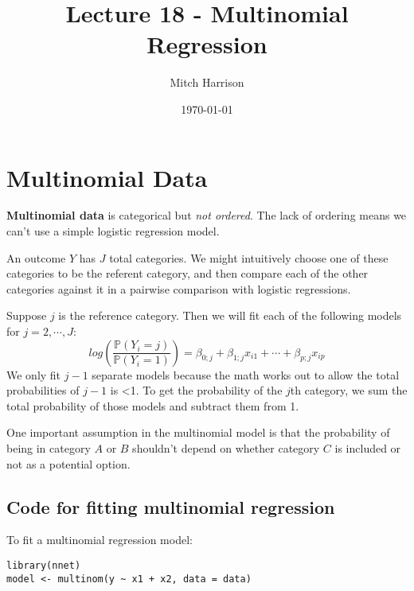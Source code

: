 \documentclass[titlepage, 12pt, leqno]{article}
\title{\Huge{Lecture 18 - Multinomial Regression}}
\author{\large{Mitch Harrison}}
\date{\today}
\begin{document}
\setlength{\parskip}{1\baselineskip}
\setlength{\parindent}{15pt}
\maketitle
\tableofcontents
\newpage


\section{Multinomial Data}

\begin{definition}
    \textbf{Multinomial data} is categorical but \textit{not ordered}. The
    lack of ordering means we can't use a simple logistic regression model.
\end{definition}

An outcome $Y$ has $J$ total categories. We might intuitively choose one of 
these categories to be the referent category, and then compare each of the
other categories against it in a pairwise comparison with logistic regressions.

Suppose $j$ is the reference category. Then we will fit each of the following
models for $j = 2, \cdots , J$:
\[
log\left(\frac{\mathbb{P}(Y_i = j)}{\mathbb{P}(Y_i = 1)}\right) =
\beta_{0;j} + \beta_{1;j}x_{i1} + \cdots + \beta_{p;j}x_{ip}
\]
We only fit $j-1$ separate models because the math works out to allow the total
probabilities of $j-1$ is <1. To get the probability of the $j$th category, we 
sum the total probability of those models and subtract them from 1.

\begin{note}
    One important assumption in the multinomial model is that the probability
    of being in category $A$ or $B$ shouldn't depend on whether category $C$ is
    included or not as a potential option.
\end{note}

\subsection{Code for fitting multinomial regression}
To fit a multinomial regression model:
\begin{verbatim}
library(nnet)
model <- multinom(y ~ x1 + x2, data = data)
\end{verbatim}
\end{document}
